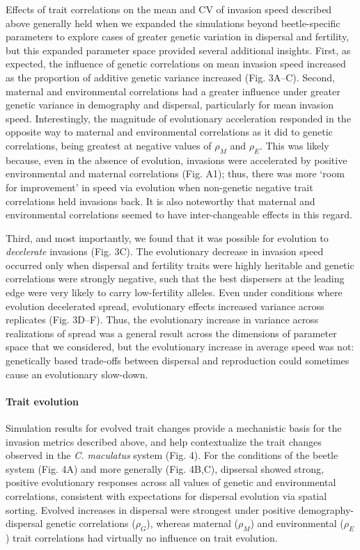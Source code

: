 \documentclass[11pt]{article}
\begin{document}
Effects of trait correlations on the mean and CV of invasion speed described above generally held when we expanded the simulations beyond beetle-specific parameters to explore cases of greater genetic variation in dispersal and fertility, but this expanded parameter space provided several additional insights.
First, as expected, the influence of genetic correlations on mean invasion speed increased as the proportion of additive genetic variance increased (Fig. 3A--C). 
Second, maternal and environmental correlations had a greater influence under greater genetic variance in demography and dispersal, particularly for mean invasion speed. 
Interestingly, the magnitude of evolutionary acceleration responded in the opposite way to maternal and environmental correlations as it did to genetic correlations, being greatest at negative values of $\rho_{M}$ and $\rho_{E}$.
This was likely because, even in the absence of evolution, invasions were accelerated by positive environmental and maternal correlations (Fig. A1); thus, there was more `room for improvement' in speed via evolution when non-genetic negative trait correlations held invasions back. 
It is also noteworthy that maternal and environmental correlations seemed to have inter-changeable effects in this regard. 

Third, and most importantly, we found that it was possible for evolution to \textit{decelerate} invasions (Fig. 3C).
The evolutionary decrease in invasion speed occurred only when dispersal and fertility traits were highly heritable and genetic correlations were strongly negative, such that the best dispersers at the leading edge were very likely to carry low-fertility alleles.
Even under conditions where evolution decelerated spread, evolutionary effects increased variance across replicates (Fig. 3D--F).
Thus, the evolutionary increase in variance across realizations of spread was a general result across the dimensions of parameter space that we considered, but the evolutionary increase in average speed was not: genetically based trade-offs between dispersal and reproduction could sometimes cause an evolutionary slow-down.


\paragraph{Trait evolution}
Simulation results for evolved trait changes provide a mechanistic basis for the invasion metrics described above, and help contextualize the trait changes observed in the \textit{C. maculatus} system (Fig. 4).
For the conditions of the beetle system (Fig. 4A) and more generally (Fig. 4B,C), dipsersal showed strong, positive evolutionary responses across all values of genetic and environmental correlations, consistent with expectations for dispersal evolution via spatial sorting.
Evolved increases in dispersal were strongest under positive demography-dispersal genetic correlations ($\rho_{G}$), whereas maternal ($\rho_{M}$) and environmental ($\rho_{E}$) trait correlations had virtually no influence on trait evolution. 
\end{document}
